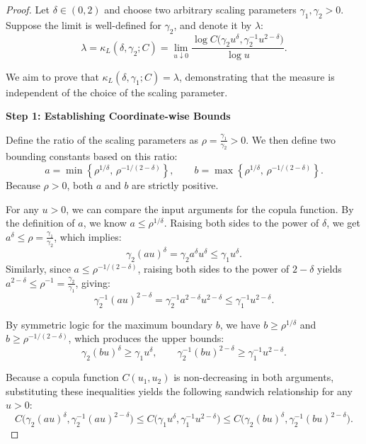 \documentclass{article}
\begin{document}
\begin{proof}
Let $\delta \in (0,2)$ and choose two arbitrary scaling parameters $\gamma_1, \gamma_2 > 0$. Suppose the limit is well-defined for $\gamma_2$, and denote it by $\lambda$:
\[
\lambda = \kappa_L(\delta,\gamma_2;C) = \lim_{u\downarrow 0} \frac{\log C\!\bigl(\gamma_2 u^\delta,\gamma_2^{-1}u^{2-\delta}\bigr)}{\log u}.
\]

We aim to prove that $\kappa_L(\delta,\gamma_1;C) = \lambda$, demonstrating that the measure is independent of the choice of the scaling parameter.

\vspace{1em}
\noindent \textbf{Step 1: Establishing Coordinate-wise Bounds}

Define the ratio of the scaling parameters as $\rho = \frac{\gamma_1}{\gamma_2} > 0$. We then define two bounding constants based on this ratio:
\[
a = \min\!\left\{\rho^{1/\delta},\,\rho^{-1/(2-\delta)}\right\}, \qquad b = \max\!\left\{\rho^{1/\delta},\,\rho^{-1/(2-\delta)}\right\}.
\]
Because $\rho > 0$, both $a$ and $b$ are strictly positive.

For any $u > 0$, we can compare the input arguments for the copula function. By the definition of $a$, we know $a \le \rho^{1/\delta}$. Raising both sides to the power of $\delta$, we get $a^\delta \le \rho = \frac{\gamma_1}{\gamma_2}$, which implies:
\[
\gamma_2(a u)^\delta = \gamma_2 a^\delta u^\delta \le \gamma_1 u^\delta.
\]
Similarly, since $a \le \rho^{-1/(2-\delta)}$, raising both sides to the power of $2-\delta$ yields $a^{2-\delta} \le \rho^{-1} = \frac{\gamma_2}{\gamma_1}$, giving:
\[
\gamma_2^{-1}(a u)^{2-\delta} = \gamma_2^{-1} a^{2-\delta} u^{2-\delta} \le \gamma_1^{-1} u^{2-\delta}.
\]

By symmetric logic for the maximum boundary $b$, we have $b \ge \rho^{1/\delta}$ and $b \ge \rho^{-1/(2-\delta)}$, which produces the upper bounds:
\[
\gamma_2(b u)^\delta \ge \gamma_1 u^\delta, \qquad \gamma_2^{-1}(b u)^{2-\delta} \ge \gamma_1^{-1} u^{2-\delta}.
\]

Because a copula function $C(u_1, u_2)$ is non-decreasing in both arguments, substituting these inequalities yields the following sandwich relationship for any $u > 0$:
\begin{equation} \label{eq:sandwich}
C\!\bigl(\gamma_2(a u)^\delta, \gamma_2^{-1}(a u)^{2-\delta}\bigr) \le C\!\bigl(\gamma_1 u^\delta, \gamma_1^{-1}u^{2-\delta}\bigr) \le C\!\bigl(\gamma_2(b u)^\delta, \gamma_2^{-1}(b u)^{2-\delta}\bigr).
\end{equation}


\end{proof}
\end{document}
